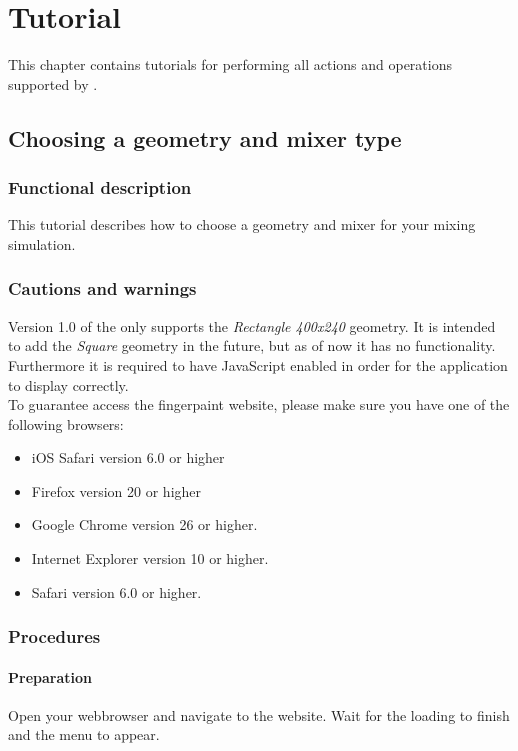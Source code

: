 \chapter{Tutorial}
This chapter contains tutorials for performing all actions and operations supported by \projectname.

\section{Choosing a geometry and mixer type}
\label{sec:ChooseGeomAndMixer}

\subsection{Functional description}
This tutorial describes how to choose a geometry and mixer for your mixing simulation.

\subsection{Cautions and warnings}

Version 1.0 of the \applicationname{} only supports the \emph{Rectangle 400x240} geometry. It is intended to add the \emph{Square} geometry in the future, but as of now it has no functionality. Furthermore it is required to have JavaScript enabled in order for the application to display correctly.\\

\noindent To guarantee access the fingerpaint website, please make sure you have one of the following browsers:\\
\begin{itemize}
\item iOS Safari version 6.0 or higher
\item Firefox version 20 or higher
\item Google Chrome version 26 or higher.
\item Internet Explorer version 10 or higher.
\item Safari version 6.0 or higher.
\end{itemize}

\subsection{Procedures}

\subsubsection{Preparation}
Open your webbrowser and navigate to the \projectname website. Wait for the loading to finish and the menu to appear.

